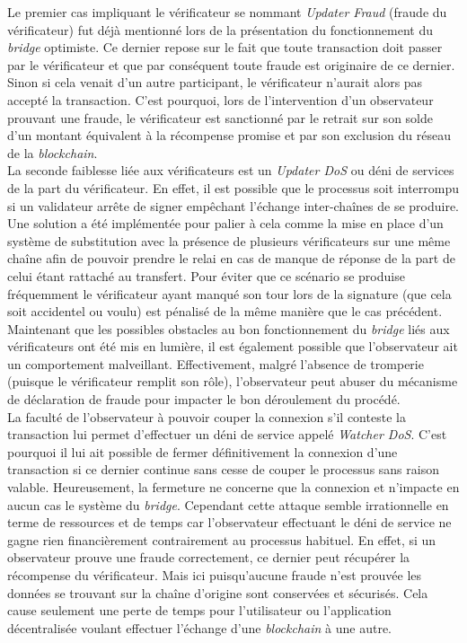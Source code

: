 Le premier cas impliquant le vérificateur se nommant \textit{Updater Fraud} (fraude du vérificateur)  fut déjà mentionné lors de la présentation du fonctionnement du \textit{bridge} optimiste. Ce dernier repose sur le fait que toute transaction doit passer par le vérificateur et que par conséquent toute fraude est originaire de ce dernier. Sinon si cela venait d’un autre participant, le vérificateur n’aurait alors pas accepté la transaction. C’est pourquoi, lors de l’intervention d’un observateur prouvant une fraude, le vérificateur est sanctionné par le retrait sur son solde d'un montant équivalent à la récompense promise et par son exclusion du réseau de la \textit{blockchain}. \\

La seconde faiblesse liée aux vérificateurs est un \textit{Updater DoS} ou déni de services de la part du vérificateur. En effet, il est possible que le processus soit interrompu si un validateur arrête de signer empêchant l'échange inter-chaînes de se produire.
Une solution a été implémentée pour palier à cela comme la mise en place d’un système de substitution avec la présence de plusieurs vérificateurs sur une même chaîne afin de pouvoir prendre le relai en cas de manque de réponse de la part de celui étant rattaché au transfert.  Pour éviter que ce scénario se produise fréquemment le vérificateur ayant manqué son tour lors de la signature (que cela soit accidentel ou voulu) est pénalisé de la même manière que le cas précédent. \\

Maintenant que les possibles obstacles au bon fonctionnement du \textit{bridge} liés aux vérificateurs ont été mis en lumière, il est également possible que l’observateur ait un comportement malveillant.  Effectivement, malgré l’absence de tromperie (puisque le vérificateur remplit son rôle), l’observateur peut abuser du mécanisme de déclaration de fraude pour impacter le bon déroulement du procédé. \\

La faculté de l’observateur à pouvoir couper la connexion s’il conteste la transaction lui permet d’effectuer un déni de service appelé \textit{Watcher DoS}. C’est pourquoi il lui ait possible de fermer définitivement la connexion d’une transaction si ce dernier continue sans cesse de couper le processus sans raison valable. Heureusement, la fermeture ne concerne que la connexion et n’impacte en aucun cas le système du \textit{bridge}. Cependant cette attaque semble irrationnelle en terme de ressources et de temps car l’observateur effectuant le déni de service ne gagne rien financièrement contrairement au processus habituel. En effet, si un observateur prouve une fraude correctement, ce dernier peut récupérer la récompense du vérificateur. Mais ici puisqu’aucune fraude n’est prouvée les données se trouvant sur la chaîne d’origine sont conservées et sécurisés. Cela cause seulement une perte de temps pour l’utilisateur ou l’application décentralisée voulant effectuer l'échange d’une \textit{\gls{blockchain}} à une autre.

